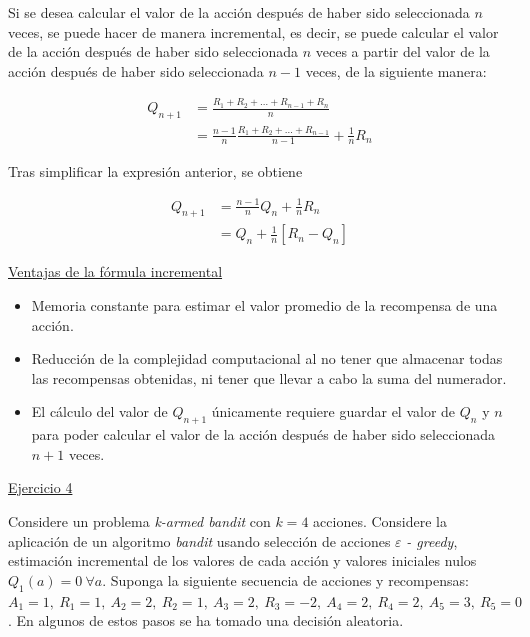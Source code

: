 \documentclass[12pt]{article}
\newlength\tindent
\renewcommand{\indent}{\hspace*{\tindent}}
\begin{document}
    Si se desea calcular el valor de la acción después de haber sido seleccionada $n$ veces, se puede hacer de manera incremental, es decir, se puede calcular el valor de la acción después de haber sido seleccionada $n$ veces a partir del valor de la acción después de haber sido seleccionada $n-1$ veces, de la siguiente manera:

    \begin{align*}
        Q_{n+1} &= \frac{R_{1} + R_{2} + \ldots + R_{n-1} + R_{n}}{n} \\
        &= \frac{n-1}{n} \frac{R_{1} + R_{2} + \ldots + R_{n-1}}{n-1} + \frac{1}{n} R_{n}
    \end{align*}

    Tras simplificar la expresión anterior, se obtiene

    \begin{align*}
        Q_{n+1} &= \frac{n-1}{n} Q_{n} + \frac{1}{n} R_{n} \\
        &= Q_{n} + \frac{1}{n} \left[ R_{n} - Q_{n} \right]
    \end{align*}

    \indent\underline{Ventajas de la fórmula incremental}

    \begin{itemize}
        \item Memoria constante para estimar el valor promedio de la recompensa de una acción.
        \item Reducción de la complejidad computacional al no tener que almacenar todas las recompensas obtenidas, ni tener que llevar a cabo la suma del numerador.
        \item El cálculo del valor de $Q_{n+1}$ únicamente requiere guardar el valor de $Q_{n}$ y $n$ para poder calcular el valor de la acción después de haber sido seleccionada $n+1$ veces.
    \end{itemize}

    \indent\underline{Ejercicio 4}

    Considere un problema \textit{k-armed bandit} con $k = 4$ acciones.
    Considere la aplicación de un algoritmo \textit{bandit} usando selección de acciones $\varepsilon$ \textit{- greedy}, estimación incremental de los valores de cada acción y valores iniciales nulos $Q_{1}(a) = 0\ \forall a$.
    Suponga la siguiente secuencia de acciones y recompensas: $A_{1}=1,\ R_{1}=1,\ A_{2}=2,\ R_{2}=1,\ A_{3}=2,\ R_{3}=-2,\ A_{4}=2,\ R_{4}=2,\ A_{5}=3,\ R_{5}=0$.
    En algunos de estos pasos se ha tomado una decisión aleatoria.
\end{document}
